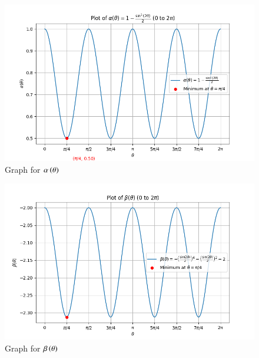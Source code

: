 \documentclass[journal,12pt,onecolumn]{IEEEtran}
\theoremstyle{remark}
\begin{document}
\begin{figure}
    \centering
    \includegraphics[width=0.5\columnwidth]{figs/alpha.png}
    \caption{Graph for $\alpha\left(\theta\right)$}
    \label{fig:placeholder}
\end{figure}
\begin{figure}
    \centering
    \includegraphics[width=0.5\columnwidth]{figs/beta.png}
    \caption{Graph for $\beta\left(\theta\right)$}
    \label{fig:placeholder}
\end{figure}
\end{document}
